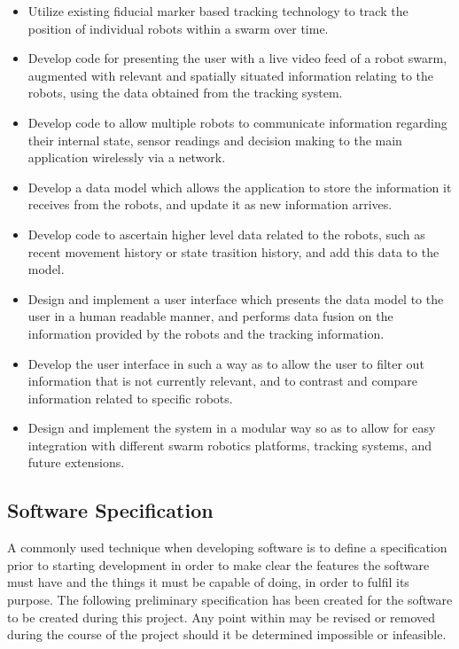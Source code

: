 \documentclass[titlepage,hidelinks,10pt]{article}
\begin{document}
\begin{itemize}
	\item Utilize existing fiducial marker based tracking technology to track the position of individual robots within a swarm over time.
	\item Develop code for presenting the user with a live video feed of a robot swarm, augmented with relevant and spatially situated information relating to the robots, using the data obtained from the tracking system.
	\item Develop code to allow multiple robots to communicate information regarding their internal state, sensor readings and decision making to the main application wirelessly via a network.
	\item Develop a data model which allows the application to store the information it receives from the robots, and update it as new information arrives.
	\item Develop code to ascertain higher level data related to the robots, such as recent movement history or state trasition history, and add this data to the model.
	\item Design and implement a user interface which presents the data model to the user in a human readable manner, and performs data fusion on the information provided by the robots and the tracking information.
	\item Develop the user interface in such a way as to allow the user to filter out information that is not currently relevant, and to contrast and compare information related to specific robots.
	\item Design and implement the system in a modular way so as to allow for easy integration with different swarm robotics platforms, tracking systems, and future extensions.
\end{itemize}

\subsection{Software Specification}
A commonly used technique when developing software is to define a specification prior to starting development in order to make clear the features the software must have and the things it must be capable of doing, in order to fulfil its purpose\cite{NASAApproach}. The following preliminary specification has been created for the software to be created during this project. Any point within may be revised or removed during the course of the project should it be determined impossible or infeasible.
\end{document}
